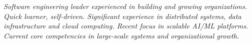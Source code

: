 {\selectfont
	\begin{justify}\textit{Software engineering leader experienced in building and growing organizations. Quick learner, self-driven. Significant experience in distributed systems, data infrastructure and cloud computing. Recent focus in scalable AI/ML platforms. Current core competencies in large-scale systems and organizational growth.}\end{justify}
}